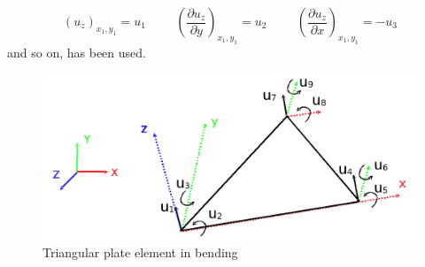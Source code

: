 \documentclass{llncs}
\begin{document}
\begin{equation}
(u_z)_{x_1,y_1} = u_1 \hspace{1cm} \left(\frac{\partial u_z}{\partial y}\right)_{x_1,y_1} = u_2 \hspace{1cm} \left(\frac{\partial u_z}{\partial x}\right)_{x_1,y_1} = -u_3
\end{equation} 
and so on, has been used.

\begin{figure}
\begin{center}
\includegraphics[width=12cm]{images/triangle}
\caption {Triangular plate element in bending}
\label{fig-triangle}
\end{center}
\end{figure}
\end{document}
